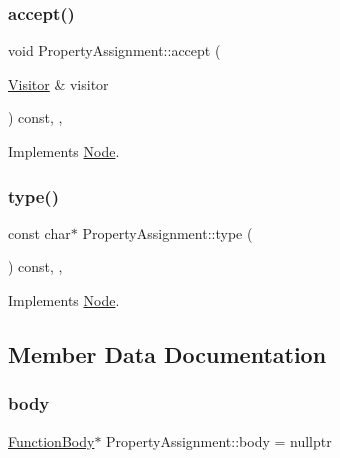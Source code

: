 \subsubsection{\texorpdfstring{accept()}{accept()}}
{\footnotesize\ttfamily void Property\+Assignment\+::accept (\begin{DoxyParamCaption}\item[{\hyperlink{struct_visitor}{Visitor} \&}]{visitor }\end{DoxyParamCaption}) const\hspace{0.3cm}{\ttfamily [inline]}, {\ttfamily [override]}, {\ttfamily [virtual]}}



Implements \hyperlink{struct_node_a10bd7af968140bbf5fa461298a969c71}{Node}.

\mbox{\label{struct_property_assignment_a77265e467948282cbfe2ff5c60ccf6da}} 
\subsubsection{\texorpdfstring{type()}{type()}}
{\footnotesize\ttfamily const char$\ast$ Property\+Assignment\+::type (\begin{DoxyParamCaption}{ }\end{DoxyParamCaption}) const\hspace{0.3cm}{\ttfamily [inline]}, {\ttfamily [override]}, {\ttfamily [virtual]}}



Implements \hyperlink{struct_node_a82f29420d0a38efcc370352528e94e9b}{Node}.



\subsection{Member Data Documentation}
\mbox{\label{struct_property_assignment_a8e2a28f8fa96db3a64a91adad7a64ca1}} 
\subsubsection{\texorpdfstring{body}{body}}
{\footnotesize\ttfamily \hyperlink{struct_function_body}{Function\+Body}$\ast$ Property\+Assignment\+::body = nullptr}


